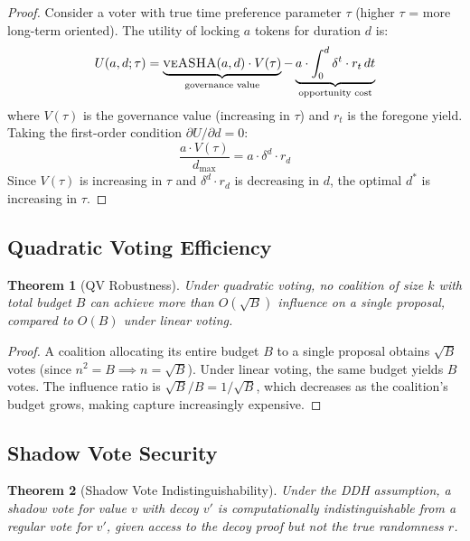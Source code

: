 \documentclass[11pt,a4paper]{article}
\newcommand{\veasha}{\textsc{veASHA}\xspace}
\newtheorem{theorem}{Theorem}
\begin{document}
\begin{proof}
Consider a voter with true time preference parameter $\tau$ (higher $\tau$ = more long-term oriented). The utility of locking $a$ tokens for duration $d$ is:
\begin{equation}
    U(a, d; \tau) = \underbrace{\veasha(a, d) \cdot V(\tau)}_{\text{governance value}} - \underbrace{a \cdot \int_0^d \delta^t \cdot r_t \, dt}_{\text{opportunity cost}}
\end{equation}
where $V(\tau)$ is the governance value (increasing in $\tau$) and $r_t$ is the foregone yield. Taking the first-order condition $\partial U / \partial d = 0$:
\begin{equation}
    \frac{a \cdot V(\tau)}{d_{\max}} = a \cdot \delta^d \cdot r_d
\end{equation}
Since $V(\tau)$ is increasing in $\tau$ and $\delta^d \cdot r_d$ is decreasing in $d$, the optimal $d^*$ is increasing in $\tau$.
\end{proof}

\subsection{Quadratic Voting Efficiency}

\begin{theorem}[QV Robustness]
Under quadratic voting, no coalition of size $k$ with total budget $B$ can achieve more than $O(\sqrt{B})$ influence on a single proposal, compared to $O(B)$ under linear voting.
\end{theorem}

\begin{proof}
A coalition allocating its entire budget $B$ to a single proposal obtains $\sqrt{B}$ votes (since $n^2 = B \implies n = \sqrt{B}$). Under linear voting, the same budget yields $B$ votes. The influence ratio is $\sqrt{B} / B = 1/\sqrt{B}$, which decreases as the coalition's budget grows, making capture increasingly expensive.
\end{proof}

\subsection{Shadow Vote Security}

\begin{theorem}[Shadow Vote Indistinguishability]
Under the DDH assumption, a shadow vote for value $v$ with decoy $v'$ is computationally indistinguishable from a regular vote for $v'$, given access to the decoy proof but not the true randomness $r$.
\end{theorem}
\end{document}
